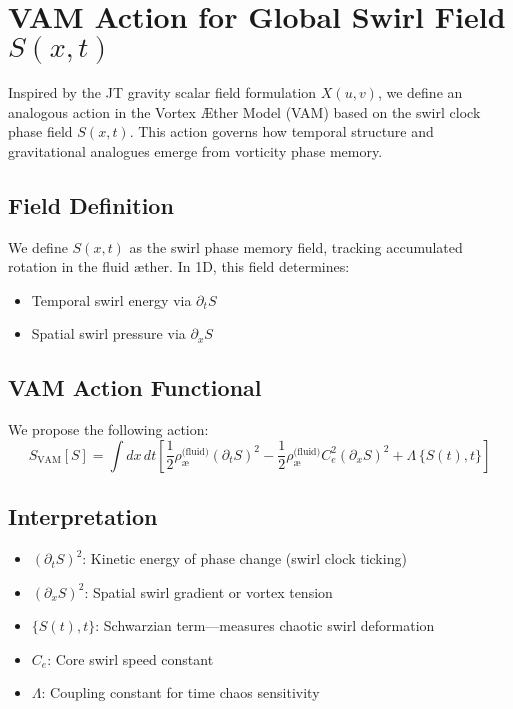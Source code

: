\documentclass[preprint]{revtex4-2}
\begin{document}
            \section*{VAM Action for Global Swirl Field $S(x,t)$}
            Inspired by the JT gravity scalar field formulation $X(u,v)$, we define an analogous action in the Vortex \AE ther Model (VAM) based on the swirl clock phase field $S(x,t)$. This action governs how temporal structure and gravitational analogues emerge from vorticity phase memory.

            \subsection*{Field Definition}
            We define $S(x,t)$ as the swirl phase memory field, tracking accumulated rotation in the fluid æther. In 1D, this field determines:
            \begin{itemize}
            \item Temporal swirl energy via $\partial_t S$
            \item Spatial swirl pressure via $\partial_x S$
            \end{itemize}

            \subsection{VAM Action Functional}
            We propose the following action:
            \begin{equation}
            \boxed{
            S_{\text{VAM}}[S] = \int dx \, dt \left[
            \frac{1}{2} \rho_{\text{\ae}}^{\text{(fluid)}} (\partial_t S)^2
            - \frac{1}{2} \rho_{\text{\ae}}^{\text{(fluid)}} C_e^2 (\partial_x S)^2
            + \Lambda \, \{ S(t), t \}
            \right]
            }
            \end{equation}

            \subsection*{Interpretation}
            \begin{itemize}
            \item $(\partial_t S)^2$: Kinetic energy of phase change (swirl clock ticking)
            \item $(\partial_x S)^2$: Spatial swirl gradient or vortex tension
                \item $\{ S(t), t \}$: Schwarzian term—measures chaotic swirl deformation
            \item $C_e$: Core swirl speed constant
            \item $\Lambda$: Coupling constant for time chaos sensitivity
            \end{itemize}
\end{document}
